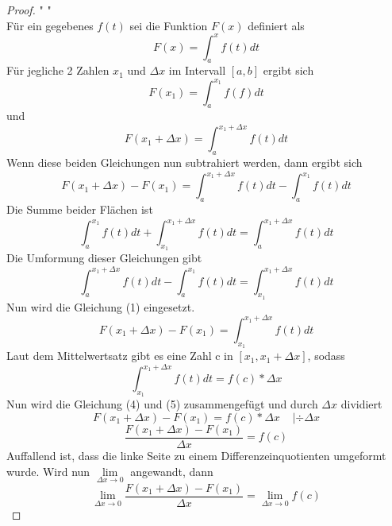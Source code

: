 \documentclass[fontsize=12pt,paper=a4,DIV12,cleardoublepage=empty, 
liststotoc,idxtotoc,bibtotoc]{article}
\theoremstyle{plain}
\theoremstyle{definition}
\begin{document}
	
	\begin{proof}" "\\
	
		Für ein gegebenes $f(t)$ sei die Funktion $F(x)$ definiert als
		\begin{equation*}
			F(x)=\int_{a}^{x}f(t)dt
		\end{equation*}
		Für jegliche 2 Zahlen $x_1$ und $\Delta x$ im Intervall $[a, b]$ ergibt sich
		\begin{equation*}
			F(x_1)=\int_{a}^{x_1}f(f)dt
		\end{equation*}
		und
		\begin{equation*}
			F(x_1+\Delta x)=\int_{a}^{x_1+\Delta x}f(t)dt
		\end{equation*}
		Wenn diese beiden Gleichungen nun subtrahiert werden, dann ergibt sich
		\begin{equation}
			F(x_1+\Delta x)-F(x_1)=\int_{a}^{x_1+\Delta x}f(t)dt-\int_{a}^{x_1}f(t)dt
		\end{equation}
		Die Summe beider Flächen ist
		\begin{equation}
			\int_{a}^{x_1}f(t)dt + \int_{x_1}^{x_1+\Delta x}f(t)dt = \int_{a}^{x_1+\Delta x}f(t)dt
		\end{equation}
		Die Umformung dieser Gleichungen gibt
		\begin{equation}
			\int_{a}^{x_1+\Delta x}f(t)dt-\int_{a}^{x_1}f(t)dt=\int_{x_1}^{x_1+\Delta x}f(t)dt
		\end{equation}
		Nun wird die Gleichung (1) eingesetzt.
		\begin{equation}
			F(x_1+\Delta x)-F(x_1)=\int_{x_1}^{x_1+\Delta x}f(t)dt
		\end{equation}
		Laut dem Mittelwertsatz gibt es eine Zahl c in $[x_1, x_1+\Delta x]$, sodass
		\begin{equation}
			\int_{x_1}^{x_1+\Delta x}f(t)dt=f(c)*\Delta x
		\end{equation}
		Nun wird die Gleichung (4) und (5) zusammengefügt und durch $\Delta x$ dividiert
		\begin{equation*}
			F(x_1+\Delta x)-F(x_1)=f(c)*\Delta x \;\;\;\;|\div \Delta x
		\end{equation*}
		\begin{equation*}
			\frac{F(x_1+\Delta x)-F(x_1)}{\Delta x}=f(c)
		\end{equation*}
		Auffallend ist, dass die linke Seite zu einem Differenzeinquotienten umgeformt wurde. Wird nun $\lim \limits_{\Delta x \to 0}$ angewandt, dann
		\begin{equation*}
			\lim \limits_{\Delta x \to 0} \frac{F(x_1+\Delta x)-F(x_1)}{\Delta x}=\lim \limits_{\Delta x \to 0}f(c)

\end{equation*}
\end{proof}
\end{document}
